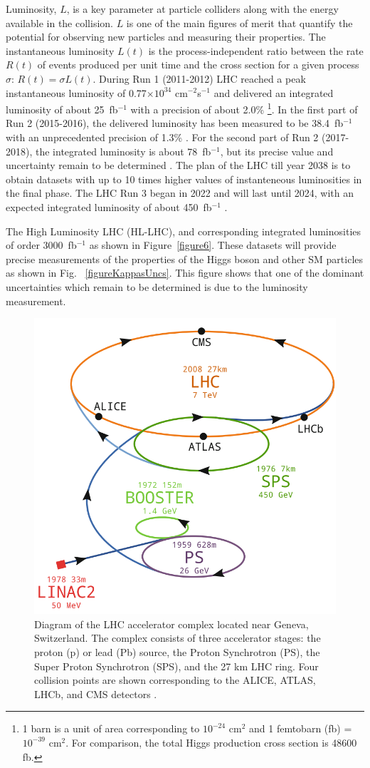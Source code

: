 \documentclass[final,12p]{article}
\newcommand{\lumi}[1]{{#1~fb$^{-1}$}}
\newcommand{\instlumi}[1]{#1$\times 10^{34}$ cm$^{-2}$s$^{-1}$}
\begin{document}
Luminosity, $L$, is a key parameter at particle colliders along with the energy available in the collision.
$L$ is one of the  main figures of merit that quantify the potential for observing new particles and measuring their properties.
The instantaneous luminosity $L(t)$ is the process-independent ratio between the rate $R(t)$ of events produced per unit time and the cross section for a given process $\sigma$:  $R(t) = \sigma L(t)$.
During Run 1 (2011-2012) LHC reached a peak instantaneous luminosity of \instlumi{0.77} and delivered an integrated luminosity of about \lumi{25} with a precision of about 2.0\% 
\footnote{1 barn is a unit of area corresponding to $10^{-24}$ cm${^2}$ and 1 femtobarn (fb) = $10^{-39}$ cm$^{2}$. For comparison, the total Higgs production cross section is 48600 fb.}.
In the first part of Run 2 (2015-2016), the delivered luminosity has been measured to be \lumi{38.4} with an unprecedented precision of 1.3\% \cite{Sirunyan:2021qkt}.
For the second part of Run 2 (2017-2018), the integrated luminosity is about \lumi{78}, but its precise value and uncertainty remain to be determined \cite{CMS:2018elu}.
The plan of the LHC till year 2038 is to obtain datasets with up to 10 times higher values of instanteneous luminosities in the final phase.
The LHC Run 3 began in 2022 and will last until 2024, with an expected integrated luminosity of about \lumi{450} \cite{lumi-run3}. 

The  High Luminosity LHC (HL-LHC), and corresponding integrated luminosities of order \lumi{3000} as shown in Figure~\ref{figure6}.
These datasets will provide  precise measurements of the properties of the Higgs boson and other SM particles as shown in Fig. ~\ref{figureKappasUncs}.
This figure shows that one of the dominant uncertainties which remain to be determined is due to the luminosity measurement.

 
\begin{figure}[H]
  \centering
  \includegraphics[width=0.6\columnwidth]{./LHCcomplex.png}
  \caption{
    Diagram of the LHC accelerator complex located near Geneva, Switzerland. The complex consists of three accelerator stages: the proton (p) or lead (Pb) source, the Proton Synchrotron (PS), the Super Proton Synchrotron (SPS), and the 27 km LHC ring. Four collision points are shown corresponding to the ALICE, ATLAS, LHCb, and CMS detectors  \cite{Mobs:2684277}.
  }
  \label{figure5}
\end{figure}
\end{document}
